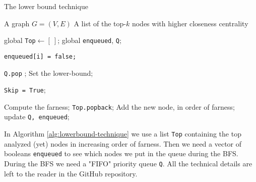 \begin{algorithm}
    \caption{The lower bound technique}\label{alg:lowerbound-technique}
    \begin{algorithmic}

    \Require A graph $G = (V,E)$
    \Ensure A list of the top-$k$ nodes with higher closeness centrality

    \State global \texttt{Top}$\gets [~]$;
    \State global \texttt{enqueued}, \texttt{Q};

          \State \texttt{enqueued[i] = false;}
    \EndFor


        \State \texttt{Q.pop} ;
        \State Set the lower-bound;

            \State \texttt{Skip = True}; 

        \Else 
            \State Compute the farness; 
            \State \texttt{Top.pop\textunderscore back}; 
            \State Add the new node, in order of farness;
            \State update \texttt{Q, enqueued};
        \EndIf

    \EndWhile




\end{algorithmic}
\end{algorithm}



\nd In Algorithm \ref*{alg:lowerbound-technique} we use a list \texttt{Top} containing the top analyzed (yet) nodes in increasing order of farness. Then we need a vector of booleans \texttt{enqueued} to see which nodes we put in the queue during the BFS. During the BFS we need a "FIFO" priority queue \texttt{Q}. All the technical details are left to the reader in the GitHub repository.
